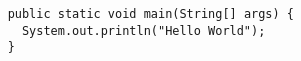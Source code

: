 \begin{figure}[H]
  \centering
  \begin{verbatim}
    public static void main(String[] args) {
      System.out.println("Hello World");
    }
  \end{verbatim}
  \label{code:java_demo}
\end{figure}
